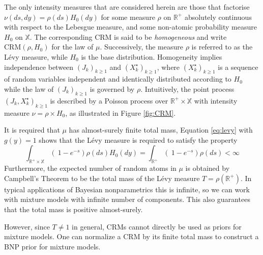 The only intensity measures that are considered herein are those that factorise $\nu(ds, dy) = \rho(ds)H_0(dy)$ for some measure $\rho$ on $\mathbb{R}^+$ absolutely continuous with respect to the Lebesgue measure, and some non-atomic probability measure $H_0$ on $\mathbb{X}$. The corresponding \gls{CRM} is said to be \textit{homogeneous} and write $\text{CRM}(\rho, H_0)$ for the law of $\mu$. Successively, the measure $\rho$ is referred to as the Lévy measure, while $H_0$ is the base distribution.
Homogeneity implies independence between $\left(J_k \right)_{k\ge1}$ and $\left(X^\star_k \right)_{k\ge1}$, where $\left(X^\star_k \right)_{k\ge1}$ is a sequence of random variables independent and identically distributed according to $H_0$ while the law of $\left(J_k \right)_{k\ge1}$  is governed by $\rho$. Intuitively, the point process $\left(J_k, X^\star_k \right)_{k\ge1}$  is described by a Poisson process over $\mathbb{R}^+ \times \mathbb{X}$ with intensity measure $\nu = \rho \times H_0$, as illustrated in Figure \ref{fig:CRM}.


It is required that $\mu$ has almost-surely finite total mass, Equation \ref{eq:levy} with $g(y)=1$ shows that the Lévy measure is required to satisfy the property
$$ \int_{\mathbb{R}^+ \times \mathbb{X}} \left( \  1 - e^{-s} \right) \rho(ds) H_0(dy) = 
\int_{\mathbb{R}^+} \left( \  1 - e^{-s} \right) \rho(ds) < \infty $$
Furthermore, the expected number of random atoms in $\mu$ is obtained by Campbell’s Theorem to be the total mass of the Lévy measure $T = \rho(\mathbb{R}^+)$. In typical applications of Bayesian nonparametrics this is infinite, so we can work with mixture models with infinite number of components. This also guarantees that the total mass is positive almost-surely. 

However, since $T \neq 1$ in general, \glspl{CRM} cannot directly be used as priors for mixture models.
One can normalize a \gls{CRM} by its finite total mass to construct a BNP prior for mixture models.\\

